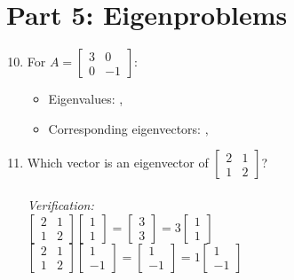 \documentclass{article}
\begin{document}
\section*{Part 5: Eigenproblems}
\begin{enumerate}
	\setcounter{enumi}{9}
	\item For $A = \begin{bmatrix} 3 & 0 \\ 0 & -1 \end{bmatrix}$:
	\begin{itemize}
		\item Eigenvalues: , 
		\item Corresponding eigenvectors: , 
	\end{itemize}
	
	\item Which vector is an eigenvector of $\begin{bmatrix} 2 & 1 \\ 1 & 2 \end{bmatrix}$? \\ 
	 \\
	\textit{Verification:} \\
	$\begin{bmatrix} 2 & 1 \\ 1 & 2 \end{bmatrix}\begin{bmatrix} 1 \\ 1 \end{bmatrix} = \begin{bmatrix} 3 \\ 3 \end{bmatrix} = 3\begin{bmatrix} 1 \\ 1 \end{bmatrix}$ \\
	$\begin{bmatrix} 2 & 1 \\ 1 & 2 \end{bmatrix}\begin{bmatrix} 1 \\ -1 \end{bmatrix} = \begin{bmatrix} 1 \\ -1 \end{bmatrix} = 1\begin{bmatrix} 1 \\ -1 \end{bmatrix}$
\end{enumerate}
\end{document}
